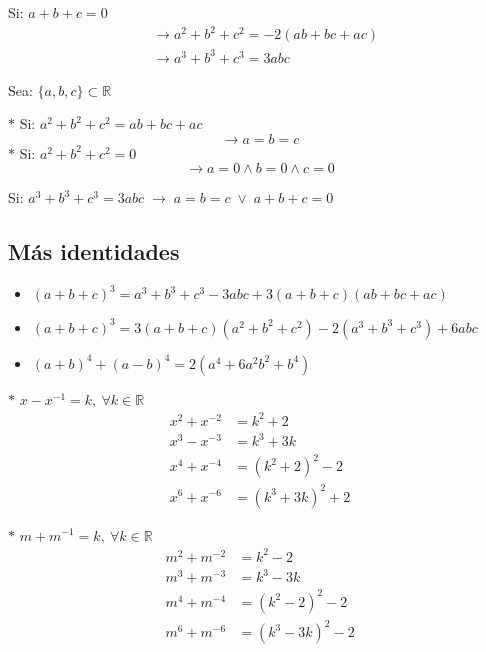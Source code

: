 \documentclass[11pt,a4paper]{article}
\newcommand{\cn}[1]{\raisebox{.5pt}{\textcircled{\raisebox{-.9pt}{\scriptsize #1}}}}
\begin{document}
\begin{minipage}[t]{0.436\textwidth}
\cn{1} Si: $a + b + c = 0$
\begin{align*}
&\rightarrow a^2 + b^2 + c^2 = -2(ab + bc + ac)\\
&\rightarrow a^3 + b^3 + c^3 = 3abc
\end{align*}
\end{minipage}\hfill
\begin{minipage}[t]{0.533\textwidth}
\cn{2} Sea: $\{a, b, c\} \subset \mathbb{R}$

$\ast$ Si: $a^2 + b^2 + c^2 = ab + bc + ac$
\[\rightarrow a = b = c\]
$\ast$ Si: $a^2 + b^2 + c^2 = 0$
\[\rightarrow a = 0 \wedge b = 0 \wedge c = 0\]
\end{minipage}

\medskip
\cn{3} Si: $a^3 + b^3 + c^3 = 3abc \;\rightarrow\; a = b = c \;\vee\; a + b + c = 0$

\subsection*{Más identidades}
\begin{itemize}[label=$\ast$]
  \item $(a+b+c)^3 = a^3 + b^3 + c^3 - 3abc + 3(a+b+c)(ab+bc+ac)$
  \item $(a+b+c)^3 = 3(a+b+c)(a^2+b^2+c^2) - 2(a^3+b^3+c^3) + 6abc$
  \item $(a+b)^4 + (a-b)^4 = 2(a^4 + 6a^2b^2 + b^4)$
\end{itemize}

\begin{minipage}[t]{0.485\textwidth}
$\ast$ $x - x^{-1} = k,\ \forall k \in \mathbb{R}$
\begin{align*}
x^2 + x^{-2} &= k^2 + 2\\
x^3 - x^{-3} &= k^3 + 3k\\
x^4 + x^{-4} &= (k^2+2)^2 - 2\\
x^6 + x^{-6} &= (k^3+3k)^2 + 2
\end{align*}
\end{minipage}\hfill
\begin{minipage}[t]{0.485\textwidth}
$\ast$ $m + m^{-1} = k,\ \forall k \in \mathbb{R}$
\begin{align*}
m^2 + m^{-2} &= k^2 - 2\\
m^3 + m^{-3} &= k^3 - 3k\\
m^4 + m^{-4} &= (k^2-2)^2 - 2\\
m^6 + m^{-6} &= (k^3-3k)^2 - 2
\end{align*}
\end{minipage}
\end{document}
